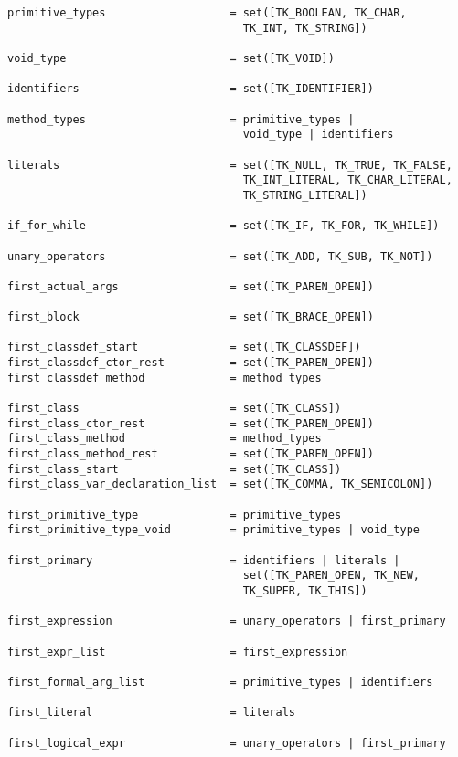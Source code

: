 \documentclass [a4paper,titlepage]{report}
\begin{document}
\begin{verbatim}
primitive_types                   = set([TK_BOOLEAN, TK_CHAR, 
                                    TK_INT, TK_STRING])

void_type                         = set([TK_VOID])

identifiers                       = set([TK_IDENTIFIER])

method_types                      = primitive_types | 
                                    void_type | identifiers

literals                          = set([TK_NULL, TK_TRUE, TK_FALSE, 
                                    TK_INT_LITERAL, TK_CHAR_LITERAL, 
                                    TK_STRING_LITERAL])

if_for_while                      = set([TK_IF, TK_FOR, TK_WHILE])

unary_operators                   = set([TK_ADD, TK_SUB, TK_NOT])

first_actual_args                 = set([TK_PAREN_OPEN])

first_block                       = set([TK_BRACE_OPEN])

first_classdef_start              = set([TK_CLASSDEF])
first_classdef_ctor_rest          = set([TK_PAREN_OPEN])
first_classdef_method             = method_types

first_class                       = set([TK_CLASS])
first_class_ctor_rest             = set([TK_PAREN_OPEN])
first_class_method                = method_types
first_class_method_rest           = set([TK_PAREN_OPEN])
first_class_start                 = set([TK_CLASS])
first_class_var_declaration_list  = set([TK_COMMA, TK_SEMICOLON])

first_primitive_type              = primitive_types
first_primitive_type_void         = primitive_types | void_type

first_primary                     = identifiers | literals | 
                                    set([TK_PAREN_OPEN, TK_NEW, 
                                    TK_SUPER, TK_THIS])

first_expression                  = unary_operators | first_primary

first_expr_list                   = first_expression

first_formal_arg_list             = primitive_types | identifiers

first_literal                     = literals

first_logical_expr                = unary_operators | first_primary


\end{verbatim}
\end{document}
